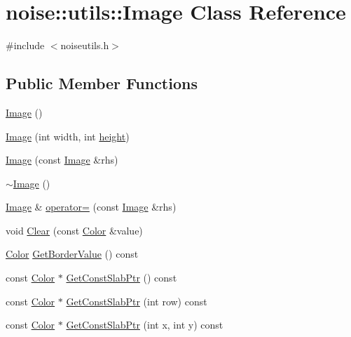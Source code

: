 \hypertarget{classnoise_1_1utils_1_1_image}{\section{noise\+:\+:utils\+:\+:Image Class Reference}
\label{classnoise_1_1utils_1_1_image}
}


{\ttfamily \#include $<$noiseutils.\+h$>$}

\subsection*{Public Member Functions}
\begin{DoxyCompactItemize}
\item 
\hyperlink{classnoise_1_1utils_1_1_image_a58edd1c45b4faeb5f789b0d036d02313}{Image} ()
\item 
\hyperlink{classnoise_1_1utils_1_1_image_afb0339b802ed560e69eb07358d30198f}{Image} (int width, int \hyperlink{_examples_2_bezier_2_app_8cpp_a48083b65ac9a863566dc3e3fff09a5b4}{height})
\item 
\hyperlink{classnoise_1_1utils_1_1_image_ac5545bfc8402fa871278bf2d56549ed4}{Image} (const \hyperlink{classnoise_1_1utils_1_1_image}{Image} \&rhs)
\item 
\hyperlink{classnoise_1_1utils_1_1_image_a0294f63700543e11c0f0da85601c7ae5}{$\sim$\+Image} ()
\item 
\hyperlink{classnoise_1_1utils_1_1_image}{Image} \& \hyperlink{classnoise_1_1utils_1_1_image_a03620991152151902fdf88dd2572b933}{operator=} (const \hyperlink{classnoise_1_1utils_1_1_image}{Image} \&rhs)
\item 
void \hyperlink{classnoise_1_1utils_1_1_image_a7674854d4739d4a8e0ec297ed0d90ced}{Clear} (const \hyperlink{classnoise_1_1utils_1_1_color}{Color} \&value)
\item 
\hyperlink{classnoise_1_1utils_1_1_color}{Color} \hyperlink{classnoise_1_1utils_1_1_image_aaa506f72d9198c6b3c861b6222c5749c}{Get\+Border\+Value} () const 
\item 
const \hyperlink{classnoise_1_1utils_1_1_color}{Color} $\ast$ \hyperlink{classnoise_1_1utils_1_1_image_a80bbbdb0b01de1bd96758ef778d9dd1c}{Get\+Const\+Slab\+Ptr} () const 
\item 
const \hyperlink{classnoise_1_1utils_1_1_color}{Color} $\ast$ \hyperlink{classnoise_1_1utils_1_1_image_a9e999f71f14c9a7ddf216b113b314160}{Get\+Const\+Slab\+Ptr} (int row) const 
\item 
const \hyperlink{classnoise_1_1utils_1_1_color}{Color} $\ast$ \hyperlink{classnoise_1_1utils_1_1_image_aa9ec64c116a3266fd69191fe311bf90e}{Get\+Const\+Slab\+Ptr} (int x, int y) const 

\end{DoxyCompactItemize}

